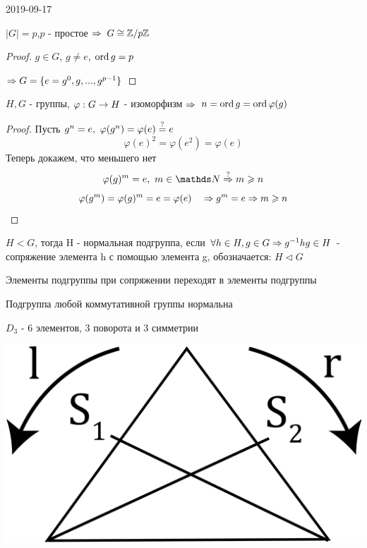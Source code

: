 \documentclass[main]{subfiles}
\begin{document}
	\begin{lect} {2019-09-17}
		\begin{utv}
		    $|G|=p$,\q $p$ - простое $\Rightarrow$ $G \cong \mathbb{Z} /p \mathbb{Z}$
		\end{utv}

		\begin{proof}
		    $g \in G$, $g \neq e$, $\mathop{\rm ord}\nolimits g=p$

		    $\Rightarrow G=\{e=g^0,g,...,g^{p-1}\}$
		\end{proof}

		\begin{utv}
		    $H,G$ - группы, $\varphi: G \rightarrow H$ - изоморфизм $\Rightarrow$ $n=\mathop{\rm ord}\nolimits g=\mathop{\rm ord}\nolimits \varphi(g)$
		\end{utv}

		\begin{proof}
		    Пусть $g^n=e,\ \varphi(g^n)=\varphi(e)\os{?}{=}e$
		    \[\varphi(e)^2=\varphi(e^2)=\varphi(e)\]
		    Теперь докажем, что меньшего нет
		    \[\varphi(g)^m = e,\ m \in \N \os{?}{\Ra} m \geqslant n\]
			\[\varphi(g^m) = \varphi(g)^m = e = \varphi(e) \quad \Rightarrow g^m = e \Rightarrow m \geqslant n\]
		\end{proof}

		\begin{definition}
		    $H<G$, тогда H - нормальная подгруппа, если $\forall h \in H, g \in G \Rightarrow g^{-1}h g \in H$ - сопряжение элемента h с помощью элемента g, обозначается: $H \triangleleft G$
		\end{definition}

		\begin{remark}
		    Элементы подгруппы при сопряжении переходят в элементы подгруппы
		\end{remark}

		\begin{remark}
		    Подгруппа любой коммутативной группы нормальна
		\end{remark}

		\begin{example}
		    $D_3$ - 6 элементов, 3 поворота и 3 симметрии

		    \includegraphics[scale=0.15]{pics/triangle_d_3.png}


\end{example}
\end{lect}
\end{document}
